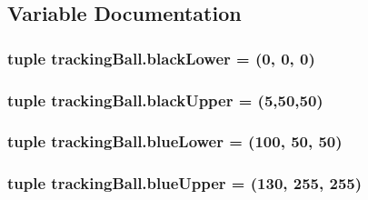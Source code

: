 \subsection{Variable Documentation}
\subsubsection[{\texorpdfstring{black\+Lower}{blackLower}}]{\setlength{\rightskip}{0pt plus 5cm}tuple tracking\+Ball.\+black\+Lower = (0, 0, 0)}\hypertarget{namespacetrackingBall_a01153645a6d9c8883679549bef428084}{}\label{namespacetrackingBall_a01153645a6d9c8883679549bef428084}
\subsubsection[{\texorpdfstring{black\+Upper}{blackUpper}}]{\setlength{\rightskip}{0pt plus 5cm}tuple tracking\+Ball.\+black\+Upper = (5,50,50)}\hypertarget{namespacetrackingBall_aa7ba379d6623121d8177f1fc3ef5034d}{}\label{namespacetrackingBall_aa7ba379d6623121d8177f1fc3ef5034d}
\subsubsection[{\texorpdfstring{blue\+Lower}{blueLower}}]{\setlength{\rightskip}{0pt plus 5cm}tuple tracking\+Ball.\+blue\+Lower = (100, 50, 50)}\hypertarget{namespacetrackingBall_a1cc45fb4974562c2699e1ef0b1ee2038}{}\label{namespacetrackingBall_a1cc45fb4974562c2699e1ef0b1ee2038}
\subsubsection[{\texorpdfstring{blue\+Upper}{blueUpper}}]{\setlength{\rightskip}{0pt plus 5cm}tuple tracking\+Ball.\+blue\+Upper = (130, 255, 255)}\hypertarget{namespacetrackingBall_a92b4c05c5050867894310e92c4ae3d66}{}\label{namespacetrackingBall_a92b4c05c5050867894310e92c4ae3d66}
